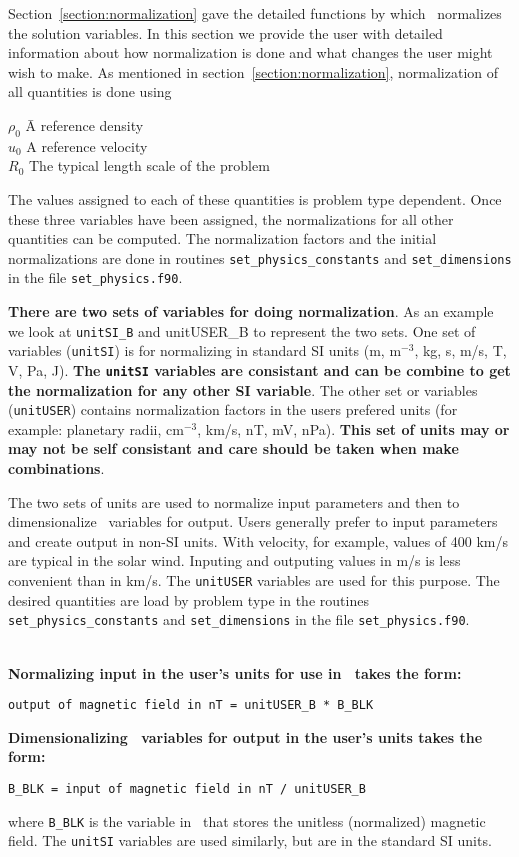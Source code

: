 Section~\ref{section:normalization} gave the detailed functions by
which \BATSRUS\ normalizes the solution variables.  In this section
we provide the user with detailed information about how normalization
is done and what changes the user might wish to make.  As mentioned in
section~\ref{section:normalization}, normalization of all quantities is
done using 
\begin{tabbing}
$\rho_0$  \hspace{0.5in} \= A reference density \\
$u_0$                    \> A reference velocity \\
$R_0$                    \> The typical length scale of the problem
\end{tabbing}
The values assigned to each of these quantities is problem type dependent.
Once these three variables have been assigned, the normalizations for all
other quantities can be computed.  The normalization factors and the initial
normalizations are done in routines {\tt set\_physics\_constants} and 
{\tt set\_dimensions} in the file {\tt set\_physics.f90}. 

{\bf There are two sets of variables for doing normalization}.  As an example we look
at {\tt unitSI\_B} and {unitUSER\_B} to represent the two sets.  One set of
variables ({\tt unitSI}) is for normalizing in standard SI units 
(m, m$^{-3}$, kg, s, m/s, T, V, Pa, J).  {\bf The {\tt unitSI} variables are consistant and
can be combine to get the normalization for any other SI variable}.  
The other set or variables ({\tt unitUSER}) contains normalization factors
in the users prefered units (for example: planetary radii, cm$^{-3}$, km/s, nT, mV, nPa).
{\bf This set of units may or may not be self consistant and care should be taken
when make combinations}.

The two sets of units are used to normalize input parameters and then to 
dimensionalize \BATSRUS\ variables for output.  Users generally prefer to
input parameters and create output in non-SI units.  With velocity, for example,
values of 400 km/s are typical in the solar wind.  Inputing and outputing
values in m/s is less convenient than in km/s.  The {\tt unitUSER} variables
are used for this purpose.  The desired quantities are load by problem type in
the routines {\tt set\_physics\_constants} and 
{\tt set\_dimensions} in the file {\tt set\_physics.f90}.  

\ \ \\
{\bf Normalizing input in the user's units for use in \BATSRUS\ takes the form:}
\begin{verbatim}
output of magnetic field in nT = unitUSER_B * B_BLK
\end{verbatim}
{\bf Dimensionalizing \BATSRUS\ variables for output in the user's units takes the form:}
\begin{verbatim}
B_BLK = input of magnetic field in nT / unitUSER_B
\end{verbatim}
where {\tt B\_BLK} is the variable in \BATSRUS\ that stores the unitless (normalized)
magnetic field.  The {\tt unitSI} variables are used similarly, but are in the
standard SI units.

